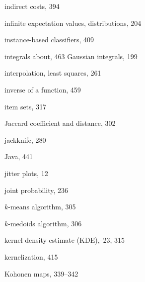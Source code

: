 \documentclass{Oreilly5980006}
\begin{document}
\begin{theindex}
  \indexspace

  \item indirect costs, 394
  \item infinite expectation values, distributions, 204
  \item instance-based classifiers, 409
  \item integrals
    \subitem about, 463
    \subitem Gaussian integrals, 199
  \item interpolation, least squares, 261
  \item inverse of a function, 459
  \item item sets, 317

  \indexspace

  \item Jaccard coefficient and distance, 302
  \item jackknife, 280
  \item Java, 441
  \item jitter plots, 12
  \item joint probability, 236

  \indexspace

  \item $k$-means algorithm, 305
  \item $k$-medoids algorithm, 306
  \item kernel density estimate (KDE),--23,  315
  \item kernelization, 415
  \item Kohonen maps, 339--342

  \indexspace


\end{theindex}
\end{document}

